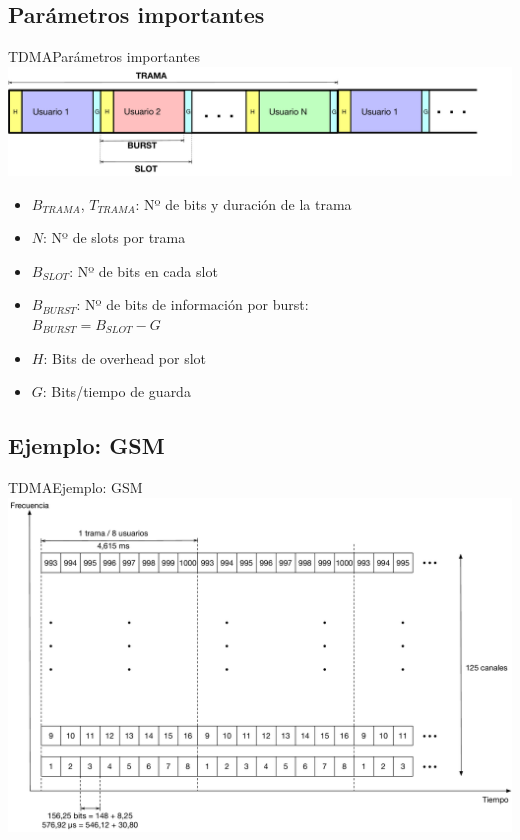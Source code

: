 \documentclass[10pt,compress]{beamer} %
\begin{document}
\subsection{Parámetros importantes} 
\begin{frame}{TDMA}{Parámetros importantes}
  \centering \includegraphics[width=0.8\linewidth]{../Apuntes/Figuras/TramasTDMA.pdf}
  \begin{itemize}
    \item $B_{TRAMA}$, $T_{TRAMA}$: Nº de bits y duración de la trama
    \item $N$: Nº de slots por trama
    \item $B_{SLOT}$: Nº de bits en cada slot
    \item $B_{BURST}$: Nº de bits de información por burst:\\
      $B_{BURST} = B_{SLOT} - G$
    \item $H$: Bits de overhead por slot
    \item $G$: Bits/tiempo de guarda
  \end{itemize}
\end{frame}

\subsection{Ejemplo: GSM}
\begin{frame}{TDMA}{Ejemplo: GSM}
  \centering \includegraphics[width=0.8\linewidth]{../Apuntes/Figuras/AccesoAlMedioGSM.pdf}
\end{frame}
\end{document}
